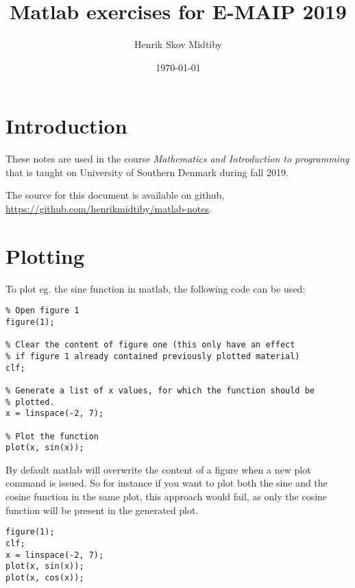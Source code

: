 \documentclass[fleqn, 12pt,a4paper]{article}
\author{Henrik Skov Midtiby}
\title{Matlab exercises for E-MAIP 2019}
\date{\today}
\newcounter{ex}
\numberwithin{ex}{section}
\begin{document}
\maketitle

\newpage
\tableofcontents

\newpage
\section*{Introduction}

These notes are used in the course \emph{Mathematics and Introduction to programming}
that is taught on University of Southern Denmark during fall 2019.

The source for this document is available on github, 
\url{https://github.com/henrikmidtiby/matlab-notes}.
















\section{Plotting}

To plot eg. the sine function in matlab, the following code
can be used:
\begin{lstlisting}
% Open figure 1
figure(1);

% Clear the content of figure one (this only have an effect 
% if figure 1 already contained previously plotted material)
clf;

% Generate a list of x values, for which the function should be 
% plotted.
x = linspace(-2, 7);

% Plot the function
plot(x, sin(x));
\end{lstlisting}

By default matlab will overwrite the content of a figure
when a new plot command is issued.
So for instance if you want to plot both the sine and the cosine 
function in the same plot, this approach would fail, as only the 
cosine function will be present in the generated plot.

\begin{lstlisting}
figure(1);
clf; 
x = linspace(-2, 7);
plot(x, sin(x));
plot(x, cos(x));
\end{lstlisting}
\end{document}
